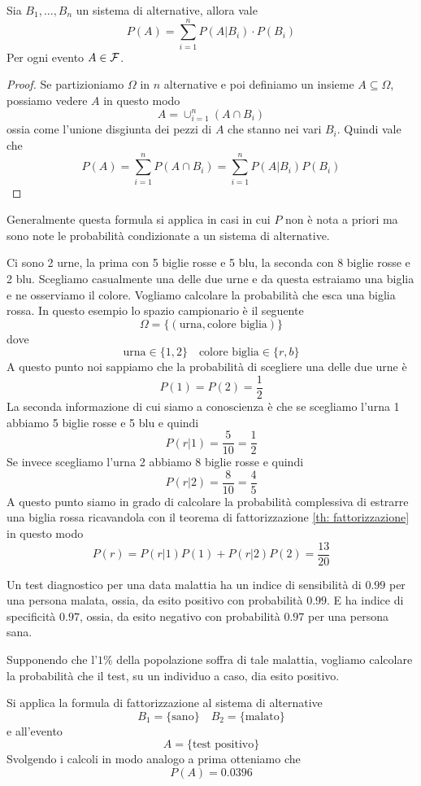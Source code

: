 \begin{theorem}[Fattorizzazione]\label{th: fattorizzazione}
	Sia $B_1, ..., B_n$ un sistema di alternative, allora vale
	\[ P(A) = \sum_{i=1}^n P(A | B_i) \cdot P(B_i) \]
	Per ogni evento $A \in \mathcal{F}$.
	\begin{proof}
		Se partizioniamo $\Omega$ in $n$ alternative e poi definiamo un insieme
		$A \subseteq \Omega$, possiamo vedere $A$ in questo modo
		\[ A = \cup_{i=1}^n (A \cap B_i) \]
		ossia come l'unione disgiunta dei pezzi di $A$ che stanno nei vari $B_i$. Quindi vale che
		\[ P(A) = \sum_{i=1}^n P(A \cap B_i) = \sum_{i=1}^n P(A | B_i) P(B_i) \]
	\end{proof}
\end{theorem}

Generalmente questa formula si applica in casi in cui $P$ non è nota a priori ma sono note le
probabilità condizionate a un sistema di alternative.

\begin{example}
	Ci sono 2 urne, la prima con 5 biglie rosse e 5 blu, la seconda con 8 biglie rosse e 2 blu.
	Scegliamo casualmente una delle due urne e da questa estraiamo una biglia e ne osserviamo il
	colore. Vogliamo calcolare la probabilità che esca una biglia rossa. In questo esempio lo
	spazio campionario è il seguente
	\[ \Omega = \{ (\text{urna}, \text{colore biglia}) \} \]
	dove
	\[ \text{urna} \in \{ 1, 2 \} \quad \text{colore biglia} \in \{ r, b \} \]
	A questo punto noi sappiamo che la probabilità di scegliere una delle due urne è
	\[ P(1) = P(2) = \frac{1}{2} \]
	La seconda informazione di cui siamo a conoscienza è che se scegliamo l'urna 1 abbiamo 5
	biglie rosse e 5 blu e quindi
	\[ P(r | 1) = \frac{5}{10} = \frac{1}{2} \]
	Se invece scegliamo l'urna 2 abbiamo 8 biglie rosse e quindi
	\[ P(r | 2) = \frac{8}{10} = \frac{4}{5} \]
	A questo punto siamo in grado di calcolare la probabilità complessiva di estrarre una biglia
	rossa ricavandola con il teorema di fattorizzazione \ref{th: fattorizzazione} in questo modo
	\[ P(r) = P(r | 1) P(1) + P(r | 2) P(2) = \frac{13}{20} \]
\end{example}

\begin{example}
	Un test diagnostico per una data malattia ha un indice di sensibilità di $0.99$ per una
	persona malata, ossia, da esito positivo con probabilità $0.99$. E ha indice di specificità
	$0.97$, ossia, da esito negativo con probabilità $0.97$ per una persona sana.

	Supponendo che l'$1\%$ della popolazione soffra di tale malattia, vogliamo calcolare la
	probabilità che il test, su un individuo a caso, dia esito positivo.

	Si applica la formula di fattorizzazione al sistema di alternative
	\[ B_1 = \{ \text{sano} \} \quad B_2 = \{ \text{malato} \} \]
	e all'evento
	\[ A = \{ \text{test positivo} \} \]
	Svolgendo i calcoli in modo analogo a prima otteniamo che
	\[ P(A) = 0.0396 \]
\end{example}

